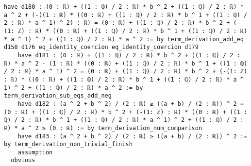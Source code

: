 \documentclass{article}
\begin{document}
\begin{tcolorbox}[colback=white!10, width=\linewidth]
\begin{lstlisting}[language=Lean4]
    have d180 : (0 : ℝ) + ((1 : ℚ) / 2 : ℝ) * b ^ 2 + ((1 : ℚ) / 2 : ℝ) * a ^ 2 + (-((1 : ℝ) * ((0 : ℝ) + ((1 : ℚ) / 2 : ℝ) * b ^ 1 + ((1 : ℚ) / 2 : ℝ) * a ^ 1) ^ 2) : ℝ) = (0 : ℝ) + ((1 : ℚ) / 2 : ℝ) * b ^ 2 + (-(1: ℤ) : ℝ) * ((0 : ℝ) + ((1 : ℚ) / 2 : ℝ) * b ^ 1 + ((1 : ℚ) / 2 : ℝ) * a ^ 1) ^ 2 + ((1 : ℚ) / 2 : ℝ) * a ^ 2 := by term_derivation_add_eq d158 d176 eq_identity_coercion eq_identity_coercion d179
    have d181 : (0 : ℝ) + ((1 : ℚ) / 2 : ℝ) * b ^ 2 + ((1 : ℚ) / 2 : ℝ) * a ^ 2 - (1 : ℝ) * ((0 : ℝ) + ((1 : ℚ) / 2 : ℝ) * b ^ 1 + ((1 : ℚ) / 2 : ℝ) * a ^ 1) ^ 2 = (0 : ℝ) + ((1 : ℚ) / 2 : ℝ) * b ^ 2 + (-(1: ℤ) : ℝ) * ((0 : ℝ) + ((1 : ℚ) / 2 : ℝ) * b ^ 1 + ((1 : ℚ) / 2 : ℝ) * a ^ 1) ^ 2 + ((1 : ℚ) / 2 : ℝ) * a ^ 2 := by term_derivation_sub_eqs_add_neg
    have d182 : (a ^ 2 + b ^ 2) / (2 : ℝ) ≥ ((a + b) / (2 : ℝ)) ^ 2 ↔ (0 : ℝ) + ((1 : ℚ) / 2 : ℝ) * b ^ 2 + (-(1: ℤ) : ℝ) * ((0 : ℝ) + ((1 : ℚ) / 2 : ℝ) * b ^ 1 + ((1 : ℚ) / 2 : ℝ) * a ^ 1) ^ 2 + ((1 : ℚ) / 2 : ℝ) * a ^ 2 ≥ (0 : ℝ) := by term_derivation_num_comparison
    have d183 : (a ^ 2 + b ^ 2) / (2 : ℝ) ≥ ((a + b) / (2 : ℝ)) ^ 2 := by term_derivation_non_trivial_finish
    assumption
  obvious

\end{lstlisting}
\end{tcolorbox}
\end{document}
